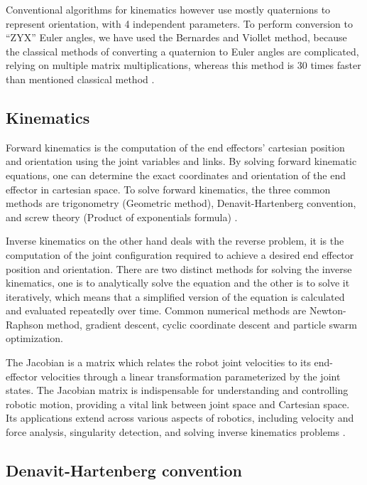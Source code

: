 \documentclass{article}
\begin{document}
Conventional algorithms for kinematics however use mostly quaternions to represent orientation, with 4 independent parameters. To perform conversion to “ZYX” Euler angles, we have used the Bernardes and Viollet method, because the classical methods of converting a quaternion to Euler angles are complicated, relying on multiple matrix multiplications, whereas this method is 30 times faster than mentioned classical method \autocite{bernardesQuaternionEulerAngles2022}.

\subsection{Kinematics}

Forward kinematics is the computation of the end effectors’ cartesian position and orientation using the joint variables and links. By solving forward kinematic equations, one can determine the exact coordinates and orientation of the end effector in cartesian space. To solve forward kinematics, the three common methods are trigonometry (Geometric method), Denavit-Hartenberg convention, and screw theory (Product of exponentials formula) \autocite{stevensForwardKinematics}.

Inverse kinematics on the other hand deals with the reverse problem, it is the computation of the joint configuration required to achieve a desired end effector position and orientation. There are two distinct methods for solving the inverse kinematics, one is to analytically solve the equation and the other is to solve it iteratively, which means that a simplified version of the equation is calculated and evaluated repeatedly over time. Common numerical methods are Newton-Raphson method, gradient descent, cyclic coordinate descent and particle swarm optimization.

The Jacobian is a matrix which relates the robot joint velocities to its end-effector velocities through a linear transformation parameterized by the joint states. The Jacobian matrix is indispensable for understanding and controlling robotic motion, providing a vital link between joint space and Cartesian space. Its applications extend across various aspects of robotics, including velocity and force analysis, singularity detection, and solving inverse kinematics problems \autocite{craigIntroductionRoboticsMechanics2014}.

\subsection{Denavit-Hartenberg convention}
\end{document}
